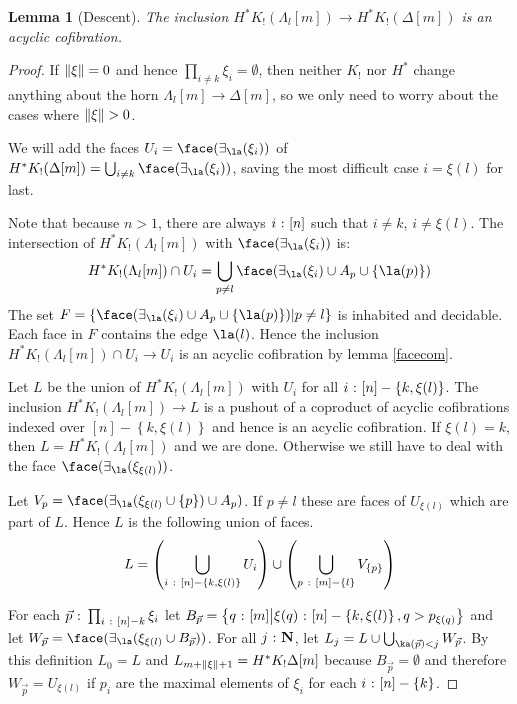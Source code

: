 \documentclass{amsart}
\theoremstyle{plain}
\newtheorem{lemma}[theorem]{Lemma}
\theoremstyle{definition}
\newcommand\set[1]{\left\{#1\right\}}
\newcommand\ri{^*}
\begin{document}
\begin{lemma}[Descent] The inclusion $H\ri K_!(\Lambda_l[m]) \to H\ri K_!(\Delta[m])$ is an acyclic cofibration. \end{lemma}


\begin{proof} If $\left\Vert\xi\right\Vert=0$ and hence $\prod_{i\neq k}\xi_i=\emptyset$, then neither $K_!$ nor $H^*$ change anything about the horn $\Lambda_l[m]\to\Delta[m]$, so we only need to worry about the cases where $\left\Vert\xi\right\Vert>0$.

We will add the faces $U_i = \face(\im\la(\xi_i))$ of $H\ri K_!(\Delta[m]) = \bigcup_{i\neq k} \face(\im\la(\xi_i))$, saving the most difficult case $i=\xi(l)$ for last.

Note that because $n>1$, there are always $i\mathord{\ :\ }[n]$ such that $i\neq k$, $i\neq \xi(l)$. The intersection of $H\ri K_!(\Lambda_l[m])$ with $\face(\im\la(\xi_i))$ is:
\[ H\ri K_!(\Lambda_l[m])\cap U_i = \bigcup_{p\neq l} \face(\im\la(\xi_i)\cup A_p\cup\set{\la(p)})\]
The set $F = \set{\face(\im\la(\xi_i)\cup A_p\cup\set{\la(p)})|p\neq l}$ is inhabited and decidable. Each face in $F$ contains the edge $\la(l)$. Hence the inclusion $H\ri K_!(\Lambda_l[m])\cap U_i\to U_i$ is an acyclic cofibration by lemma \ref{facecom}.

Let $L$ be the union of $H\ri K_!(\Lambda_l[m])$ with $U_i$ for all $i\of[n] -\set{k, \xi(l)}$. The inclusion $H\ri K_!(\Lambda_l[m])\to L$ is a pushout of a coproduct of acyclic cofibrations indexed over $[n]-\set{k,\xi(l)}$ and hence is an acyclic cofibration. If $\xi(l)=k$, then $L=H\ri K_!(\Lambda_l[m])$ and we are done. Otherwise we still have to deal with the face $\face(\im\la(\xi_{\xi(l)}))$.

Let $V_p =\face(\im\la(\xi_{\xi(l)}\cup\set p)\cup A_p)$. If $p\neq l$ these are faces of $U_{\xi(l)}$ which are part of $L$. Hence $L$ is the following union of faces.
\[ L = \left(\bigcup_{i\of[n]-\set{k,\xi(l)}} U_i\right)\cup\left(\bigcup_{p\of[m]-\set l} V_{\set p}\right) \] 

For each $\vec p\mathord{\ :\ }\prod_{i\mathord{\ :\ }[n]-{k}} \xi_i$ let $B_{\vec p} = \set{q\of[m]\middle | \xi(q)\of[n]-\set{k,\xi(l)} , q>p_{\xi(q)} }$ and let $W_{\vec p} = \face(\im\la(\xi_{\xi(l)}\cup B_{\vec p}))$. For all $j\mathord{\ :\ }\mathbf N$, let $L_{j} = L\cup \bigcup_{ \ka(\vec p) < j } W_{\vec p}$. By this definition $L_0=L$ and $L_{m+\left\Vert\xi\right\Vert+1} = H^*K_!\Delta[m]$ because $B_{\vec p}=\emptyset$ and therefore $W_{\vec p} = U_{\xi(l)}$ if $p_i$ are the maximal elements of $\xi_i$ for each $i\of[n]-\set k$. 


\end{proof}
\end{document}
